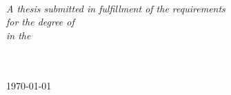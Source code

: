 \documentclass[
11pt, %
english, %
singlespacing, %
headsepline, %
]{MastersDoctoralThesis} %
\begin{document}
\begin{titlepage}
\begin{center}
\begin{minipage}[t]{0.5\textwidth}
		\end{minipage}\\[1.5cm]

		\vfill

		\large \textit{A thesis submitted in fulfillment of the requirements\\ for the degree of \degreename}\\[0.3cm] %
		\textit{in the}\\[0.4cm]
		\groupname\\\deptname\\[1cm] %

		\vfill

		{\large \today}\\[1cm] %

		\vfill
	\end{center}
\end{titlepage}



\end{document}
